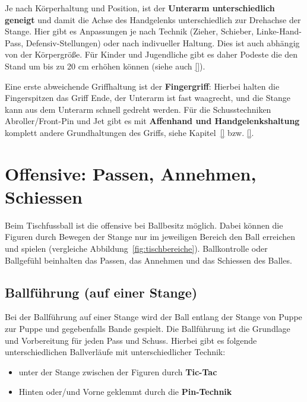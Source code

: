 Je nach Körperhaltung und Position, ist der \textbf{Unterarm unterschiedlich geneigt} und damit die Achse des Handgelenks unterschiedlich zur Drehachse der Stange.
Hier gibt es Anpassungen je nach Technik (Zieher, Schieber, Linke-Hand-Pass, Defensiv-Stellungen) oder nach indivueller Haltung.
Dies ist auch abhängig von der Körpergröße. 
Für Kinder und Jugendliche gibt es daher Podeste die den Stand um bis zu 20 cm erhöhen können (siehe auch \ref{}).


Eine erste abweichende Griffhaltung ist der \textbf{Fingergriff}: Hierbei halten die Fingerspitzen das Griff Ende, der Unterarm ist fast waagrecht, und die Stange kann aus dem Unterarm schnell gedreht werden.
Für die Schusstechniken Abroller/Front-Pin und Jet gibt es mit \textbf{Affenhand und Handgelenkshaltung} komplett andere Grundhaltungen des Griffs, siehe Kapitel~\ref{} bzw. \ref{}.


\section{Offensive: Passen, Annehmen, Schiessen}
\label{technik:offensive}

Beim Tischfussball ist die \gls{offensive} bei Ballbesitz möglich.
Dabei können die Figuren durch Bewegen der Stange nur im jeweiligen Bereich den Ball erreichen und spielen (vergleiche Abbildung~\ref{fig:tischbereiche}).
Ballkontrolle oder Ballgefühl beinhalten das Passen, das Annehmen und das Schiessen des Balles.

\subsection{Ballführung (auf einer Stange)} 
\label{technik:offensive:eine}

Bei der Ballführung auf einer Stange wird der Ball entlang der Stange von Puppe zur Puppe und gegebenfalls Bande gespielt. 
Die Ballführung ist die Grundlage und Vorbereitung für jeden Pass und Schuss.
Hierbei gibt es folgende unterschiedlichen Ballverläufe mit unterschiedlicher Technik:
\begin{itemize}
    \item unter der Stange zwischen der Figuren durch \textbf{Tic-Tac}
    \item Hinten oder/und Vorne geklemmt durch die \textbf{Pin-Technik}
\end{itemize}

